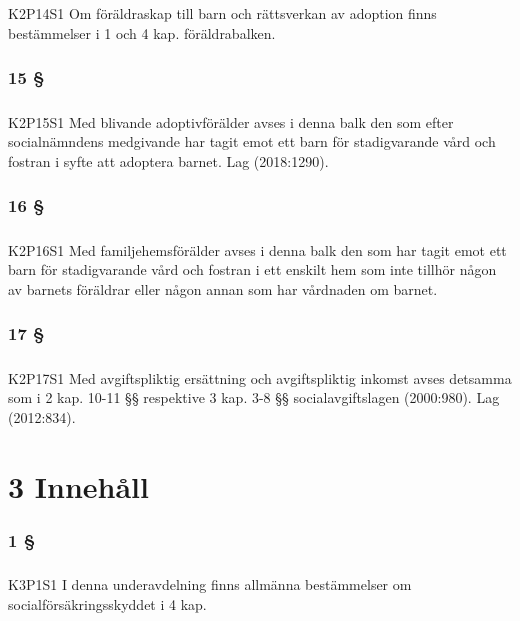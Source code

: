 \documentclass[a4paper,notitlepage,openany,10pt]{book}
\begin{document}
\paragraph*{}
{\tiny K2P14S1}
Om föräldraskap till barn och rättsverkan av adoption finns bestämmelser i 1 och 4 kap. föräldrabalken.
\subsection*{15 §}
\paragraph*{}
{\tiny K2P15S1}
Med blivande adoptivförälder avses i denna balk den som efter socialnämndens medgivande har tagit emot ett barn för stadigvarande vård och fostran i syfte att adoptera barnet.
Lag (2018:1290).
\subsection*{16 §}
\paragraph*{}
{\tiny K2P16S1}
Med familjehemsförälder avses i denna balk den som har tagit emot ett barn för stadigvarande vård och fostran i ett enskilt hem som inte tillhör någon av barnets föräldrar eller någon annan som har vårdnaden om barnet.
\subsection*{17 §}
\paragraph*{}
{\tiny K2P17S1}
Med avgiftspliktig ersättning och avgiftspliktig inkomst avses detsamma som i 2 kap. 10-11 §§ respektive 3 kap. 3-8 §§ socialavgiftslagen (2000:980).
Lag (2012:834).
\chapter*{3 Innehåll}
\subsection*{1 §}
\paragraph*{}
{\tiny K3P1S1}
I denna underavdelning finns allmänna bestämmelser om socialförsäkringsskyddet i 4 kap.
\end{document}

